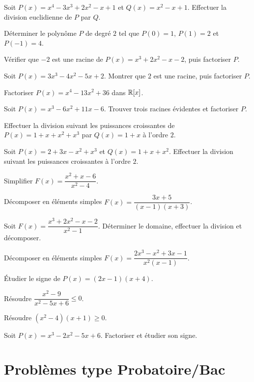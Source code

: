 \exo{}
Soit $P(x) = x^4 - 3x^3 + 2x^2 - x + 1$ et $Q(x) = x^2 - x + 1$. Effectuer la division euclidienne de $P$ par $Q$.

\exo{}
Déterminer le polynôme $P$ de degré $2$ tel que $P(0) = 1$, $P(1) = 2$ et $P(-1) = 4$.


\exo{}
Vérifier que $-2$ est une racine de $P(x) = x^3 + 2x^2 - x - 2$, puis factoriser $P$.

\exo{}
Soit $P(x) = 3x^3 - 4x^2 - 5x + 2$. Montrer que $2$ est une racine, puis factoriser $P$.

\exo{}
Factoriser $P(x) = x^4 - 13x^2 + 36$ dans $\mathbb{R}[x]$.

\exo{}
Soit $P(x) = x^3 - 6x^2 + 11x - 6$. Trouver trois racines évidentes et factoriser $P$.


\exo{}
Effectuer la division suivant les puissances croissantes de $P(x) = 1 + x + x^2 + x^3$ par $Q(x) = 1 + x$ à l'ordre $2$.

\exo{}
Soit $P(x) = 2 + 3x - x^2 + x^3$ et $Q(x) = 1 + x + x^2$. Effectuer la division suivant les puissances croissantes à l'ordre $2$.


\exo{}
Simplifier $F(x) = \dfrac{x^2 + x - 6}{x^2 - 4}$.

\exo{}
Décomposer en éléments simples $F(x) = \dfrac{3x + 5}{(x-1)(x+3)}$.

\exo{}
Soit $F(x) = \dfrac{x^3 + 2x^2 - x - 2}{x^2 - 1}$. Déterminer le domaine, effectuer la division et décomposer.

\exo{}
Décomposer en éléments simples $F(x) = \dfrac{2x^3 - x^2 + 3x - 1}{x^2(x-1)}$.


\exo{}
Étudier le signe de $P(x) = (2x-1)(x+4)$.

\exo{}
Résoudre $\dfrac{x^2 - 9}{x^2 - 5x + 6} \leq 0$.

\exo{}
Résoudre $(x^2 - 4)(x+1) \geq 0$.

\exo{}
Soit $P(x) = x^3 - 2x^2 - 5x + 6$. Factoriser et étudier son signe.

\section{Problèmes type Probatoire/Bac}

